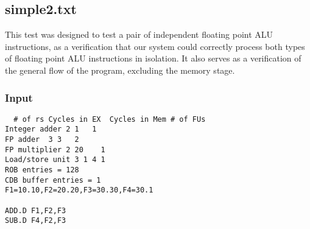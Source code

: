 \documentclass[12pt]{article}
\begin{document}
\subsection{simple2.txt}
This test was designed to test a pair of independent floating point ALU instructions, as a verification that our system could correctly process both types of floating point ALU instructions in isolation.  It also serves as a verification of the general flow of the program, excluding the memory stage.

\subsubsection*{Input}
\begin{verbatim}
  # of rs Cycles in EX  Cycles in Mem # of FUs
Integer adder 2 1   1
FP adder  3 3   2
FP multiplier 2 20    1
Load/store unit 3 1 4 1
ROB entries = 128
CDB buffer entries = 1
F1=10.10,F2=20.20,F3=30.30,F4=30.1

ADD.D F1,F2,F3
SUB.D F4,F2,F3
\end{verbatim}
\end{document}
